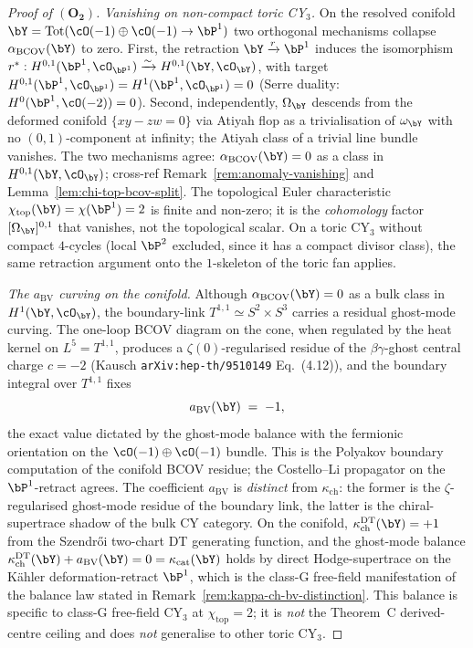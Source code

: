 \begin{proof}[Proof of $(\mathbf{O_2})$]
\emph{Vanishing on non-compact toric CY$_3$.} On the resolved conifold
$\bY = \mathrm{Tot}(\cO(-1)\oplus\cO(-1) \to\bP^1)$ two orthogonal
mechanisms collapse $\alpha_{\mathrm{BCOV}}(\bY)$ to zero. First, the
retraction $\bY \xrightarrow{r} \bP^1$ induces the isomorphism
$r^\ast: H^{0,1}(\bP^1, \cO_{\bP^1}) \xrightarrow{\sim}
H^{0,1}(\bY, \cO_\bY)$, with target
$H^{0,1}(\bP^1, \cO_{\bP^1}) = H^1(\bP^1, \cO_{\bP^1}) = 0$
(Serre duality: $H^0(\bP^1, \cO(-2)) = 0$). Second, independently,
$\Omega_\bY$ descends from the deformed conifold $\{xy - zw = 0\}$
via Atiyah flop as a trivialisation of $\omega_\bY$ with no
$(0,1)$-component at infinity; the Atiyah class of a trivial line
bundle vanishes. The two mechanisms agree:
$\alpha_{\mathrm{BCOV}}(\bY) = 0$ as a class in $H^{0,1}(\bY, \cO_\bY)$;
cross-ref Remark~\ref{rem:anomaly-vanishing} and
Lemma~\ref{lem:chi-top-bcov-split}. The topological Euler
characteristic $\chi_{\mathrm{top}}(\bY) = \chi(\bP^1) = 2$ is finite
and non-zero; it is the \emph{cohomology} factor $[\Omega_\bY]^{0,1}$
that vanishes, not the topological scalar. On a toric CY$_3$ without
compact $4$-cycles (local $\bP^2$ excluded, since it has a compact
divisor class), the same retraction argument onto the $1$-skeleton of
the toric fan applies.

\emph{The $a_{\mathrm{BV}}$ curving on the conifold.}
Although $\alpha_{\mathrm{BCOV}}(\bY)=0$ as a bulk class in
$H^1(\bY,\cO_{\bY})$, the boundary-link $T^{1,1}\simeq S^2\times S^3$
carries a residual ghost-mode curving. The one-loop BCOV diagram on
the cone, when regulated by the heat kernel on $L^5=T^{1,1}$,
produces a $\zeta(0)$-regularised residue of the $\beta\gamma$-ghost
central charge $c=-2$ (Kausch \texttt{arXiv:hep-th/9510149}
Eq.~(4.12)), and the boundary integral over $T^{1,1}$ fixes
\[
 a_{\mathrm{BV}}(\bY) \;=\; -1,
\]
the exact value dictated by the ghost-mode balance with the
fermionic orientation on the $\cO(-1)\oplus\cO(-1)$ bundle. This
is the Polyakov boundary computation of the conifold BCOV
residue; the Costello--Li propagator on the $\bP^1$-retract agrees.
The coefficient $a_{\mathrm{BV}}$ is \emph{distinct} from
$\kappa_{\mathrm{ch}}$: the former is the $\zeta$-regularised
ghost-mode residue of the boundary link, the latter is the
chiral-supertrace shadow of the bulk CY category. On the conifold,
$\kappa_{\mathrm{ch}}^{\mathrm{DT}}(\bY)=+1$ from the Szendr\H{o}i
two-chart DT generating function, and the ghost-mode balance
$\kappa_{\mathrm{ch}}^{\mathrm{DT}}(\bY)+
a_{\mathrm{BV}}(\bY)=0=\kappa_{\mathrm{cat}}(\bY)$ holds by
direct Hodge-supertrace on the Kähler deformation-retract $\bP^1$,
which is the class-G free-field manifestation of the balance law
stated in Remark~\ref{rem:kappa-ch-bv-distinction}. This balance
is specific to class-G free-field CY$_3$ at $\chi_{\mathrm{top}}=2$;
it is \emph{not} the Theorem~C derived-centre ceiling and does
\emph{not} generalise to other toric CY$_3$.


\end{proof}
